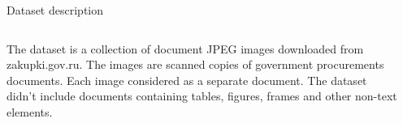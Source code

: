 \documentclass{beamer}
\begin{document}
\begin{frame}{Dataset description}
    \begin{columns}
        \begin{column}{0.5\textwidth}
        The dataset is a collection of document JPEG images downloaded from zakupki.gov.ru. The images are scanned copies of government procurements documents. Each image considered as a separate document. The dataset didn't include documents containing tables, figures, frames and other non-text elements.
        \end{column}
        \begin{column}{0.5\textwidth}
        \end{column}
    \end{columns}
\end{frame}
\end{document}

